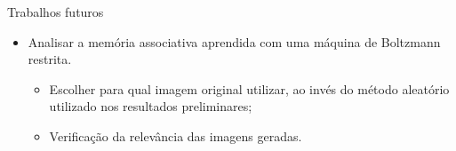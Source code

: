 \documentclass{beamer}
\begin{document}
\begin{frame}{Trabalhos futuros}
\setlength\leftmargini{0em}
\justifying
  \begin{itemize}
  \item Analisar a memória associativa aprendida com uma máquina de Boltzmann restrita.
  \begin{itemize}
    \item Escolher para qual imagem original utilizar, ao invés do método aleatório utilizado nos resultados preliminares;
    \item Verificação da relevância das imagens geradas.
  \end{itemize}
  \end{itemize}
\end{frame}
\end{document}
